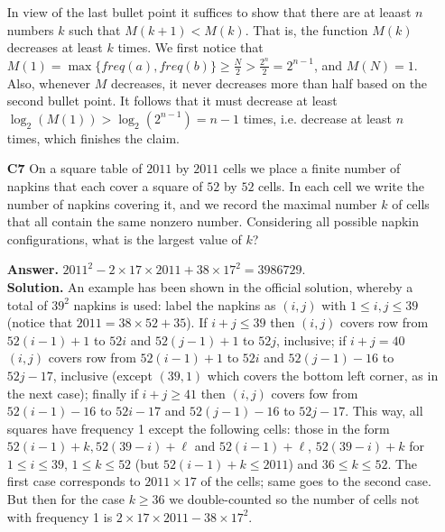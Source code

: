 \documentclass[11pt,a4paper]{article}
\begin{document}
\begin{enumerate}
\begin{itemize}
	\end{itemize}
	In view of the last bullet point it suffices to show that there are at leaast $n$ numbers $k$ such that $M(k+1)<M(k)$. That is, the function $M(k)$ decreases at least $k$ times. We first notice that $M(1)=\max \{freq(a), freq(b)\}\ge \frac{N}{2}>\frac{2^n}{2}=2^{n-1}$, and $M(N)=1$. Also, whenever $M$ decreases, it never decreases more than half based on the second bullet point. It follows that it must decrease at least $\log_2(M(1))>\log_2(2^{n-1})=n-1$ times, i.e. decrease at least $n$ times, which finishes the claim. 
	
	\item[\textbf{C7}] On a square table of $2011$ by $2011$ cells we place a finite number of napkins that each cover a square of $52$ by $52$ cells. In each cell we write the number of napkins covering it, and we record the maximal number $k$ of cells that all contain the same nonzero number. Considering all possible napkin configurations, what is the largest value of $k$?
	
	\textbf{Answer.} $2011^2-2\times 17\times 2011 + 38 \times 17^2 = 3986729$. \\
	\textbf{Solution.} An example has been shown in the official solution, whereby a total of $39^2$ napkins is used: label the napkins as $(i, j)$ with $1\le i, j\le 39$ (notice that $2011=38\times 52+35$). If $i+j\le 39$ then $(i, j)$ covers row from $52(i-1)+1$ to $52i$ and $52(j-1)+1$ to $52j$, inclusive; 
	if $i+j=40$ $(i, j)$ covers row from $52(i-1)+1$ to $52i$ and $52(j-1)-16$ to $52j-17$, inclusive (except $(39, 1)$ which covers the bottom left corner, as in the next case); finally if $i+j\ge 41$ then $(i, j)$ covers fow from $52(i-1)-16$ to $52i-17$ and $52(j-1)-16$ to $52j-17$. 
	This way, all squares have frequency 1 except the following cells: those in the form $52(i-1)+k, 52(39-i)+\ell$ and $52(i-1)+\ell$, $52(39-i)+k$ for $1\le i\le 39$, $1\le k\le 52$ (but $52(i-1)+k\le 2011$) and $36\le k\le 52$. 
	The first case corresponds to $2011\times 17$ of the cells; same goes to the second case. But then for the case $k\ge 36$ we double-counted so the number of cells not with frequency 1 is $2\times 17\times 2011-38\times 17^2$. 
	

\end{enumerate}
\end{document}
